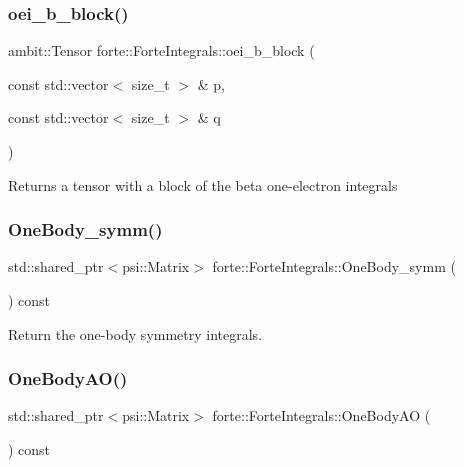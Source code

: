 \subsubsection{\texorpdfstring{oei\+\_\+b\+\_\+block()}{oei\_b\_block()}}
{\footnotesize\ttfamily ambit\+::\+Tensor forte\+::\+Forte\+Integrals\+::oei\+\_\+b\+\_\+block (\begin{DoxyParamCaption}\item[{const std\+::vector$<$ size\+\_\+t $>$ \&}]{p,  }\item[{const std\+::vector$<$ size\+\_\+t $>$ \&}]{q }\end{DoxyParamCaption})}

\begin{DoxyReturn}{Returns}
a tensor with a block of the beta one-\/electron integrals 
\end{DoxyReturn}
\mbox{\label{classforte_1_1_forte_integrals_a61ed6c6eef6af54c77d9b62806cf5368}} 
\subsubsection{\texorpdfstring{One\+Body\+\_\+symm()}{OneBody\_symm()}}
{\footnotesize\ttfamily std\+::shared\+\_\+ptr$<$psi\+::\+Matrix$>$ forte\+::\+Forte\+Integrals\+::\+One\+Body\+\_\+symm (\begin{DoxyParamCaption}{ }\end{DoxyParamCaption}) const}



Return the one-\/body symmetry integrals. 

\mbox{\label{classforte_1_1_forte_integrals_a44fb4e730761a5b9cd51d35562e01021}} 
\subsubsection{\texorpdfstring{One\+Body\+A\+O()}{OneBodyAO()}}
{\footnotesize\ttfamily std\+::shared\+\_\+ptr$<$psi\+::\+Matrix$>$ forte\+::\+Forte\+Integrals\+::\+One\+Body\+AO (\begin{DoxyParamCaption}{ }\end{DoxyParamCaption}) const}



